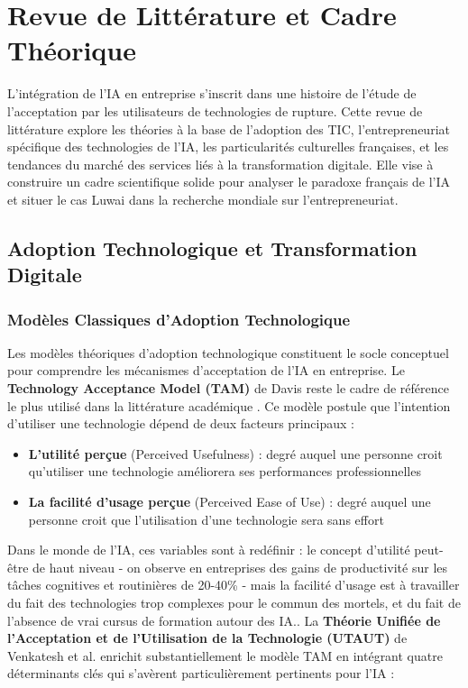 \chapter{Revue de Littérature et Cadre Théorique}
\label{chap:literature_review}

L'intégration de l'IA en entreprise s'inscrit dans une histoire de l'étude de l'acceptation par les utilisateurs de technologies de rupture. Cette revue de littérature explore les théories à la base de l'adoption des TIC, l'entrepreneuriat spécifique des technologies de l'IA, les particularités culturelles françaises, et les tendances du marché des services liés à la transformation digitale. Elle vise à construire un cadre scientifique solide pour analyser le paradoxe français de l'IA et situer le cas Luwai dans la recherche mondiale sur l'entrepreneuriat.

\section{Adoption Technologique et Transformation Digitale}

\subsection{Modèles Classiques d'Adoption Technologique}

Les modèles théoriques d'adoption technologique constituent le socle conceptuel pour comprendre les mécanismes d'acceptation de l'IA en entreprise. Le \textbf{Technology Acceptance Model (TAM)} de Davis \cite{davis1989perceived} reste le cadre de référence le plus utilisé dans la littérature académique \cite{artimon2025theorie}. Ce modèle postule que l'intention d'utiliser une technologie dépend de deux facteurs principaux :
\medskip
\begin{itemize}
    \item \textbf{L'utilité perçue} (Perceived Usefulness) : degré auquel une personne croit qu'utiliser une technologie améliorera ses performances professionnelles
    \item \textbf{La facilité d'usage perçue} (Perceived Ease of Use) : degré auquel une personne croit que l'utilisation d'une technologie sera sans effort
\end{itemize}
\medskip
Dans le monde de l’IA, ces variables sont à redéfinir : le concept d’utilité peut-être de haut niveau - on observe en entreprises des gains de productivité sur les tâches cognitives et routinières de 20-40\% - mais la facilité d’usage est à travailler du fait des technologies trop complexes pour le commun des mortels, et du fait de l’absence de vrai cursus de formation autour des IA.\cite{psicosmart2024resistance}.
\newpage
La \textbf{Théorie Unifiée de l'Acceptation et de l'Utilisation de la Technologie (UTAUT)} de Venkatesh et al. \cite{venkatesh2003user} enrichit substantiellement le modèle TAM en intégrant quatre déterminants clés qui s'avèrent particulièrement pertinents pour l'IA :

